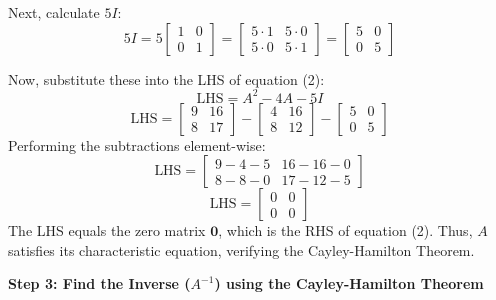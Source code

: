 \documentclass{article}
\begin{document}
Next, calculate $5I$:
\[ 5 I = 5 \begin{bmatrix} 1 & 0 \\ 0 & 1 \end{bmatrix} = \begin{bmatrix} 5 \cdot 1 & 5 \cdot 0 \\ 5 \cdot 0 & 5 \cdot 1 \end{bmatrix} = \begin{bmatrix} 5 & 0 \\ 0 & 5 \end{bmatrix} \]

Now, substitute these into the LHS of equation (2):
\[ \text{LHS} = A^2 - 4A - 5I \]
\[ \text{LHS} = \begin{bmatrix} 9 & 16 \\ 8 & 17 \end{bmatrix} - \begin{bmatrix} 4 & 16 \\ 8 & 12 \end{bmatrix} - \begin{bmatrix} 5 & 0 \\ 0 & 5 \end{bmatrix} \]
Performing the subtractions element-wise:
\[ \text{LHS} = \begin{bmatrix} 9 - 4 - 5 & 16 - 16 - 0 \\ 8 - 8 - 0 & 17 - 12 - 5 \end{bmatrix} \]
\[ \text{LHS} = \begin{bmatrix} 0 & 0 \\ 0 & 0 \end{bmatrix} \]
The LHS equals the zero matrix $\mathbf{0}$, which is the RHS of equation (2).
Thus, $A$ satisfies its characteristic equation, verifying the Cayley-Hamilton Theorem.

\textbf{Step 3: Find the Inverse ($A^{-1}$) using the Cayley-Hamilton Theorem}
\end{document}
